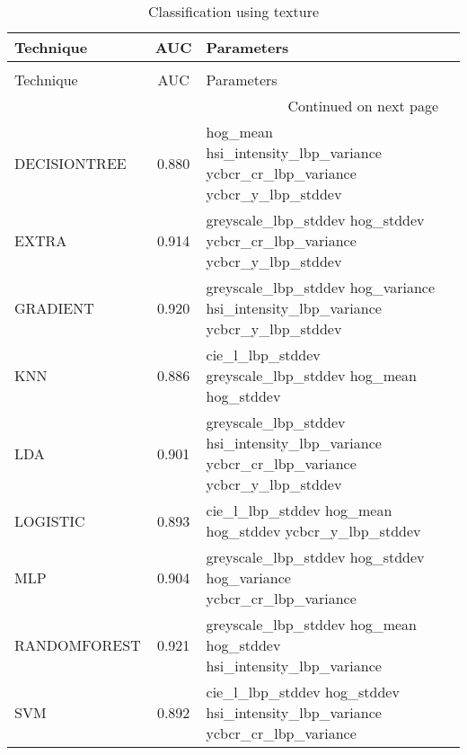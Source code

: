 \begin{longtable}{lcll}
\caption[Classification using texture]{Classification using texture}
\label{table:results-texture}\\
\toprule
   Technique &   AUC &                                                                               Parameters \\
\midrule
\endfirsthead
\caption[]{Classification using texture} \\
\toprule
   Technique &   AUC &                                                                               Parameters \\
\midrule
\endhead
\midrule
\multicolumn{3}{r}{{Continued on next page}} \\
\midrule
\endfoot

\bottomrule
\endlastfoot
DECISIONTREE & 0.880 &            hog\_mean hsi\_intensity\_lbp\_variance ycbcr\_cr\_lbp\_variance ycbcr\_y\_lbp\_stddev \\
       EXTRA & 0.914 &                greyscale\_lbp\_stddev hog\_stddev ycbcr\_cr\_lbp\_variance ycbcr\_y\_lbp\_stddev \\
    GRADIENT & 0.920 &          greyscale\_lbp\_stddev hog\_variance hsi\_intensity\_lbp\_variance ycbcr\_y\_lbp\_stddev \\
         KNN & 0.886 &                               cie\_l\_lbp\_stddev greyscale\_lbp\_stddev hog\_mean hog\_stddev \\
         LDA & 0.901 & greyscale\_lbp\_stddev hsi\_intensity\_lbp\_variance ycbcr\_cr\_lbp\_variance ycbcr\_y\_lbp\_stddev \\
    LOGISTIC & 0.893 &                                  cie\_l\_lbp\_stddev hog\_mean hog\_stddev ycbcr\_y\_lbp\_stddev \\
         MLP & 0.904 &                       greyscale\_lbp\_stddev hog\_stddev hog\_variance ycbcr\_cr\_lbp\_variance \\
RANDOMFOREST & 0.921 &                      greyscale\_lbp\_stddev hog\_mean hog\_stddev hsi\_intensity\_lbp\_variance \\
         SVM & 0.892 &             cie\_l\_lbp\_stddev hog\_stddev hsi\_intensity\_lbp\_variance ycbcr\_cr\_lbp\_variance \\
\end{longtable}
